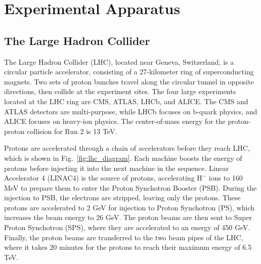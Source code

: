 \chapter{Experimental Apparatus}
\label{chap:apparatus}

\graphicspath{{2_Experimental_Apparatus/Figures/}}

\section{The Large Hadron Collider}
\label{sec:large_had_collider}

The Large Hadron Collider (LHC), located near Geneva, Switzerland, is a circular particle accelerator, 
consisting of a 27-kilometer ring of superconducting magnets.
Two sets of proton bunches travel along the circular tunnel in opposite directions,
then collide at the experiment sites. The four large experiments located at the LHC ring are CMS, ATLAS, LHCb, and ALICE. The CMS and ATLAS
detectors are multi-purpose, while LHCb focuses on b-quark physics, and ALICE focuses on heavy-ion physics. The center-of-mass energy 
for the proton-proton collision for Run 2 is 13 TeV.

Protons are accelerated through a chain of accelerators before they reach LHC, which is shown in Fig.~\ref{fig:lhc_diagram}.
Each machine boosts the energy of protons before injecting it into the next machine in the sequence. Linear Accelerator 4 (LINAC4)
is the source of protons, accelerating $\textrm{H}^{-}$ ions to 160 MeV to prepare them to enter the Proton Synchotron Booster (PSB). During the injection
to PSB, the electrons are stripped, leaving only the protons. These protons are accelerated to 2 GeV for injection to Proton 
Synchotron (PS), which increases the beam energy to 26 GeV. The proton beams are then sent to Super Proton Synchotron (SPS), where they are accelerated
to an energy of 450 GeV. Finally, the proton beams are transferred to the two beam pipes of the LHC, where it takes 20 minutes for the protons to reach
their maximum energy of 6.5 TeV. 

